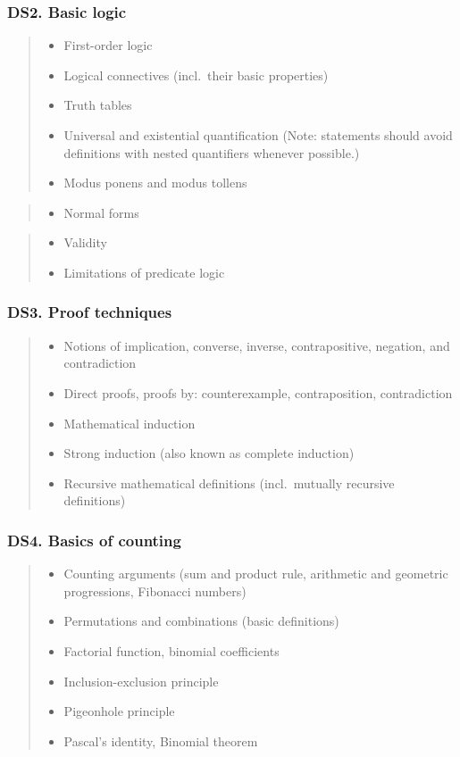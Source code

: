 \documentclass[a4paper,11pt,oneside]{article}
\newcommand{\cmark}{\ding{51}}%
\newcommand{\xmark}{\ding{55}}%
\newcommand{\CC}[1]{#1}
\newcommand{\cincl}{{\small\cmark}}
\newcommand{\cdefi}{{\small\cmark\faFileTextO}}
\newcommand{\ccode}{{\small\cmark\faFileText}}
\newcommand{\cnfoc}{{\small\faQuestion}}
\newcommand{\cexcl}{{\small\xmark}}
\newcommand{\Iincluded}{\item[\hbox to 1.8em{\cincl\hfill}]}
\newcommand{\Idefine}{\item[\hbox to 1.8em{\cdefi\hfill}]}
\newcommand{\Icodeonly}{\item[\hbox to 1.8em{\ccode\hfill}]}
\newcommand{\Inofocus}{\item[\hbox to 1.8em{\cnfoc\hfill}]}
\newcommand{\Iexcluded}{\item[\hbox to 1.8em{\cexcl\hfill}]}
\newenvironment{myitemize}{\begin{quote}\begin{itemize}\itemsep 0pt}{\end{itemize}\end{quote}}
\begin{document}
    \subsubsection*{DS2. Basic logic}

        \begin{myitemize}
        \Iincluded First-order logic
        \Iincluded\CC{Logical connectives} (incl.\ their basic properties)
        \Iincluded\CC{Truth tables}
        \Iincluded\CC{Universal and existential quantification} (Note: statements should avoid definitions with nested quantifiers whenever possible.)
        \Icodeonly\CC{Modus ponens and modus tollens}
        \end{myitemize}

        \begin{myitemize}
        \Inofocus \CC{Normal forms}
        \end{myitemize}
        
        \begin{myitemize}
        \Iexcluded \CC{Validity}
        \Iexcluded \CC{Limitations of predicate logic}
        \end{myitemize}

    \subsubsection*{DS3. Proof techniques}

        \begin{myitemize}
        \Idefine\CC{Notions of implication, converse, inverse, contrapositive, negation, and contradiction}
        \Icodeonly\CC{Direct proofs, proofs by: counterexample, contraposition, contradiction}
        \Icodeonly\CC{Mathematical induction}
        \Icodeonly\CC{Strong induction} (also known as complete induction)
        \Iincluded\CC{Recursive mathematical definitions} (incl.\ mutually recursive definitions)
        \end{myitemize}

    \subsubsection*{DS4. Basics of counting}

        \begin{myitemize}
        \Iincluded\CC{Counting arguments (sum and product rule, arithmetic and geometric progressions, Fibonacci numbers)}
        \Idefine\CC{Permutations and combinations (basic definitions)}
        \Idefine Factorial function, binomial coefficients
        \Icodeonly\CC{Inclusion-exclusion principle}
        \Icodeonly\CC{Pigeonhole principle}
        \Icodeonly\CC{Pascal's identity}, \CC{Binomial theorem}
        \end{myitemize}
\end{document}
